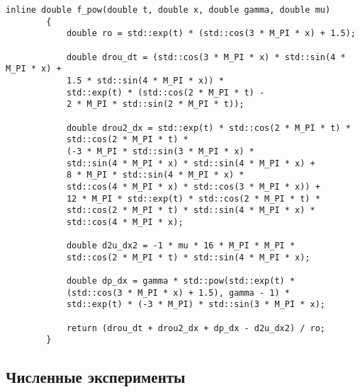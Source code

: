 \documentclass[11pt]{extarticle}
\begin{document}
	\begin{lstlisting}[]
		inline double f_pow(double t, double x, double gamma, double mu)
		{
			double ro = std::exp(t) * (std::cos(3 * M_PI * x) + 1.5);
			
			double drou_dt = (std::cos(3 * M_PI * x) * std::sin(4 * M_PI * x) + 
			1.5 * std::sin(4 * M_PI * x)) *
			std::exp(t) * (std::cos(2 * M_PI * t) - 
			2 * M_PI * std::sin(2 * M_PI * t));
			
			double drou2_dx = std::exp(t) * std::cos(2 * M_PI * t) * 
			std::cos(2 * M_PI * t) * 
			(-3 * M_PI * std::sin(3 * M_PI * x) * 
			std::sin(4 * M_PI * x) * std::sin(4 * M_PI * x) + 
			8 * M_PI * std::sin(4 * M_PI * x) * 
			std::cos(4 * M_PI * x) * std::cos(3 * M_PI * x)) +
			12 * M_PI * std::exp(t) * std::cos(2 * M_PI * t) * 
			std::cos(2 * M_PI * t) * std::sin(4 * M_PI * x) * 
			std::cos(4 * M_PI * x);
			
			double d2u_dx2 = -1 * mu * 16 * M_PI * M_PI * 
			std::cos(2 * M_PI * t) * std::sin(4 * M_PI * x);
			
			double dp_dx = gamma * std::pow(std::exp(t) * 
			(std::cos(3 * M_PI * x) + 1.5), gamma - 1) * 
			std::exp(t) * (-3 * M_PI) * std::sin(3 * M_PI * x);
			
			return (drou_dt + drou2_dx + dp_dx - d2u_dx2) / ro;
		}
	\end{lstlisting}

	\subsection{Численные эксперименты}
	
\end{document}
